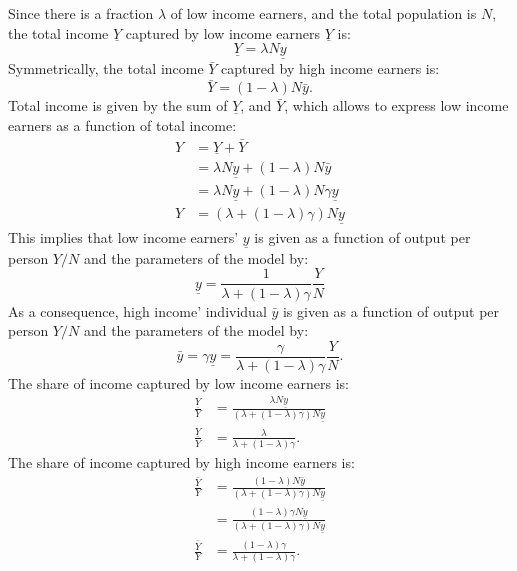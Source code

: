 \documentclass[]{book}
\theoremstyle{definition}
\theoremstyle{definition}
\theoremstyle{definition}
\theoremstyle{remark}
\begin{document}
Since there is a fraction \(\lambda\) of low income earners, and the
total population is \(N\), the total income \(\underline{Y}\) captured
by low income earners \(\underline{Y}\) is:
\[\underline{Y} = \lambda N \underline y\] Symmetrically, the total
income \(\bar{Y}\) captured by high income earners is:
\[\bar{Y}=(1-\lambda)N \bar{y}.\] Total income is given by the sum of
\(\underline{Y}\), and \(\bar{Y}\), which allows to express low income
earners as a function of total income: \[
\begin{aligned}
Y&=\underline{Y} + \bar{Y}\\
&=\lambda N \underline{y}+(1-\lambda) N \bar{y}\\
&=\lambda N \underline{y}+(1-\lambda) N \gamma\underline{y}\\
Y&=\left(\lambda +(1-\lambda)\gamma\right)N\underline{y}
\end{aligned}
\] This implies that low income earners' \(\underline{y}\) is given as a
function of output per person \(Y/N\) and the parameters of the model
by: \[\underline{y}=\frac{1}{\lambda+(1-\lambda)\gamma}\frac{Y}{N}\] As
a consequence, high income' individual \(\bar{y}\) is given as a
function of output per person \(Y/N\) and the parameters of the model
by:
\[\bar{y}=\gamma\underline{y}=\frac{\gamma}{\lambda+(1-\lambda)\gamma}\frac{Y}{N}.\]
The share of income captured by low income earners is: \[
\begin{aligned}
\frac{\underline{Y}}{Y}&=\frac{\lambda N \underline{y}}{\left(\lambda +(1-\lambda)\gamma\right)N\underline{y}}\\
\frac{\underline{Y}}{Y}&=\frac{\lambda}{\lambda +(1-\lambda)\gamma}.
\end{aligned}
\] The share of income captured by high income earners is: \[
\begin{aligned}
\frac{\bar{Y}}{Y}&=\frac{(1-\lambda) N \bar{y}}{\left(\lambda +(1-\lambda)\gamma\right)N\underline{y}}\\
&=\frac{(1-\lambda)\gamma N \underline{y}}{\left(\lambda +(1-\lambda)\gamma\right)N\underline{y}}\\
\frac{\bar{Y}}{Y}&=\frac{(1-\lambda)\gamma}{\lambda +(1-\lambda)\gamma}.
\end{aligned}
\]
\end{document}
